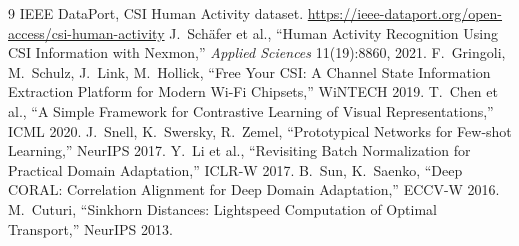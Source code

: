 \documentclass[11pt,a4paper]{article}
\begin{document}
\begin{thebibliography}{9}\small
{} IEEE DataPort, CSI Human Activity dataset. \url{https://ieee-dataport.org/open-access/csi-human-activity}
 J.~Sch\"afer et al., ``Human Activity Recognition Using CSI Information with Nexmon,'' \emph{Applied Sciences} 11(19):8860, 2021.
 F.~Gringoli, M.~Schulz, J.~Link, M.~Hollick, ``Free Your CSI: A Channel State Information Extraction Platform for Modern Wi-Fi Chipsets,'' WiNTECH 2019.
 T.~Chen et al., ``A Simple Framework for Contrastive Learning of Visual Representations,'' ICML 2020.
 J.~Snell, K.~Swersky, R.~Zemel, ``Prototypical Networks for Few-shot Learning,'' NeurIPS 2017.
 Y.~Li et al., ``Revisiting Batch Normalization for Practical Domain Adaptation,'' ICLR-W 2017.
 B.~Sun, K.~Saenko, ``Deep CORAL: Correlation Alignment for Deep Domain Adaptation,'' ECCV-W 2016.
 M.~Cuturi, ``Sinkhorn Distances: Lightspeed Computation of Optimal Transport,'' NeurIPS 2013.
\end{thebibliography}
\end{document}
